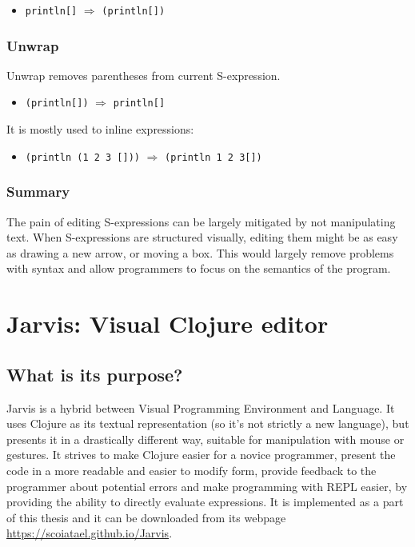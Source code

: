 \documentclass[11pt]{scrartcl}
\begin{document}
\begin{itemize}
\item \lstinline|println[]| $\Rightarrow$ \lstinline|(println[])|
\end{itemize}

\subsubsection*{Unwrap}
Unwrap removes parentheses from current S-expression.
\begin{itemize}
  \item \lstinline|(println[])| $\Rightarrow$ \lstinline|println[]|
\end{itemize}

It is mostly used to inline expressions:
\begin{itemize}
  \item \lstinline|(println (1 2 3 []))| $\Rightarrow$
    \lstinline|(println 1 2 3[])|
\end{itemize}

\subsubsection{Summary}
The pain of editing S-expressions can be largely mitigated by not manipulating
text.
When S-expressions are structured visually, editing them might be as easy as
drawing a new arrow, or moving a box.
This would largely remove problems with syntax and allow programmers to focus on
the semantics of the program.


\section{Jarvis: Visual Clojure editor}
\subsection{What is its purpose?}
Jarvis is a hybrid between Visual Programming Environment and Language.
It uses Clojure as its textual representation (so it’s not strictly a new
language), but presents it in a drastically different way, suitable for
manipulation with mouse or gestures.
It strives to make Clojure easier for a novice programmer, present the code in a
more readable and easier to modify form, provide feedback to the programmer
about potential errors and make programming with REPL easier, by providing the
ability to directly evaluate expressions.
It is implemented as a part of this thesis and it can be downloaded from its
webpage \url{https://scoiatael.github.io/Jarvis}.
\end{document}
